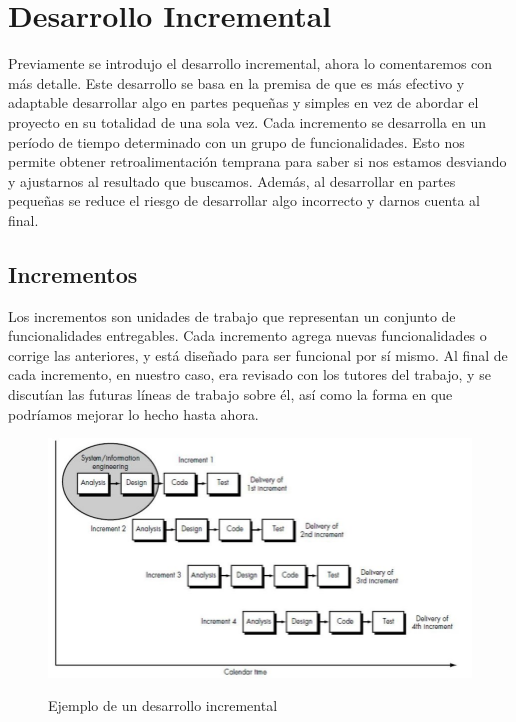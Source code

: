 \section{Desarrollo Incremental}

Previamente se introdujo el desarrollo incremental, ahora lo comentaremos con más detalle.
Este desarrollo se basa en la premisa de que es más efectivo y adaptable desarrollar algo en partes pequeñas y simples en vez de abordar el proyecto en su totalidad de una sola vez. Cada incremento se desarrolla en un período de tiempo determinado con un grupo de funcionalidades. Esto nos permite obtener retroalimentación temprana para saber si nos estamos desviando y ajustarnos al resultado que buscamos. Además, al desarrollar en partes pequeñas se reduce el riesgo de desarrollar algo incorrecto y darnos cuenta al final.

\subsection{Incrementos}

Los incrementos son unidades de trabajo que representan un conjunto de funcionalidades entregables. Cada incremento agrega nuevas funcionalidades o corrige las anteriores, y está diseñado para ser funcional por sí mismo. Al final de cada incremento, en nuestro caso, era revisado con los tutores del trabajo, y se discutían las futuras líneas de trabajo sobre él, así como la forma en que podríamos mejorar lo hecho hasta ahora.


\begin{figure}[h]
\centering
\includegraphics[width=12cm]{imaxes/Incremental-software-development-model.png}
\label{fig:pointnetc}
\caption{Ejemplo de un desarrollo incremental \cite{inproceedings}}
\end{figure}


